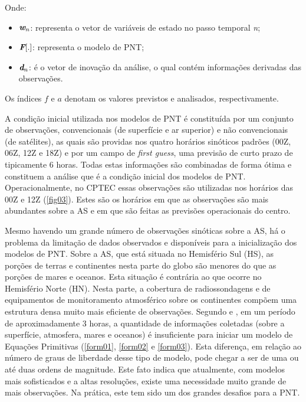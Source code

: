 Onde:

\begin{itemize}
\item $\textit{\textbf{w}}_{n}$: representa o vetor de variáveis de estado no passo temporal \textit{n};
\item $\textit{\textbf{F}}[.]$: representa o modelo de PNT;
\item $\textit{\textbf{d}}_{n}$: é o vetor de inovação da análise, o qual contém informações derivadas das observações.
\end{itemize}

Os índices $\textit{f}$ e $\textit{a}$ denotam os valores previstos e analisados, respectivamente.

A condição inicial utilizada nos modelos de PNT é constituída por um conjunto de observações, convencionais (de superfície e ar superior) e não convencionais (de satélites), as quais são providas nos quatro horários sinóticos padrões (00Z, 06Z, 12Z e 18Z) e por um campo de \textit{first guess}, uma previsão de curto prazo de tipicamente 6 horas. Todas estas informações são combinadas de forma ótima e constituem a análise que é a condição inicial dos modelos de PNT. Operacionalmente, no CPTEC essas observações são utilizadas nos horários das 00Z e 12Z (\autoref{fig03}). Estes são os horários em que as observações são mais abundantes sobre a AS e em que são feitas as previsões operacionais do centro. 

Mesmo havendo um grande número de observações sinóticas sobre a AS, há o problema da limitação de dados observados e disponíveis para a inicialização dos modelos de PNT. Sobre a AS, que está situada no Hemisfério Sul (HS), as porções de terras e continentes nesta parte do globo são menores do que as porções de mares e oceanos. Esta situação é contrária ao que ocorre no Hemisfério Norte (HN). Nesta parte, a cobertura de radiossondagens e de equipamentos de monitoramento atmosférico sobre os continentes compõem uma estrutura densa muito mais eficiente de observações. Segundo \cite{morel1980} e \cite{kalnay2003}, em um período de aproximadamente 3 horas, a quantidade de informações coletadas (sobre a superfície, atmosfera, mares e oceanos) é insuficiente para iniciar um modelo de Equações Primitivas (\autoref{form01}, \autoref{form02} e \autoref{form03}). Esta diferença, em relação ao número de graus de liberdade desse tipo de modelo, pode chegar a ser de uma ou até duas ordens de magnitude. Este fato indica que atualmente, com modelos mais sofisticados e a altas resoluções, existe uma necessidade muito grande de mais observações. Na prática, este tem sido um dos grandes desafios para a PNT. 

